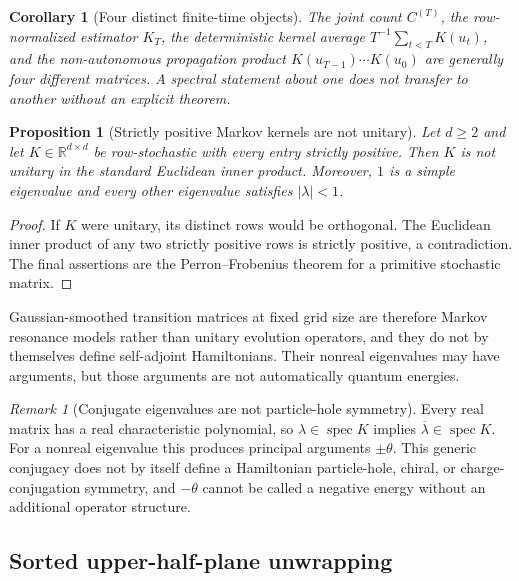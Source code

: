 \documentclass[11pt]{article}
\newtheorem{proposition}[theorem]{Proposition}
\newtheorem{corollary}[theorem]{Corollary}
\theoremstyle{definition}
\theoremstyle{remark}
\newtheorem{remark}[theorem]{Remark}
\newcommand{\R}{\mathbb R}
\newcommand{\spec}{\operatorname{spec}}
\begin{document}
\begin{corollary}[Four distinct finite-time objects]\label{cor:four-objects}
The joint count $C^{(T)}$, the row-normalized estimator $K_T$, the deterministic kernel average $T^{-1}\sum_{t<T}K(u_t)$, and the non-autonomous propagation product $K(u_{T-1})\cdots K(u_0)$ are generally four different matrices.  A spectral statement about one does not transfer to another without an explicit theorem.
\end{corollary}

\begin{proposition}[Strictly positive Markov kernels are not unitary]\label{prop:markov-not-unitary}
Let $d\ge2$ and let $K\in\R^{d\times d}$ be row-stochastic with every entry strictly positive.  Then $K$ is not unitary in the standard Euclidean inner product.
Moreover, $1$ is a simple eigenvalue and every other eigenvalue satisfies $|\lambda|<1$.
\end{proposition}

\begin{proof}
If $K$ were unitary, its distinct rows would be orthogonal.  The Euclidean inner product of any two strictly positive rows is strictly positive, a contradiction.  The final assertions are the Perron--Frobenius theorem for a primitive stochastic matrix.
\end{proof}

Gaussian-smoothed transition matrices at fixed grid size are therefore Markov resonance models rather than unitary evolution operators, and they do not by themselves define self-adjoint Hamiltonians.  Their nonreal eigenvalues may have arguments, but those arguments are not automatically quantum energies.

\begin{remark}[Conjugate eigenvalues are not particle-hole symmetry]\label{rem:conjugate}
Every real matrix has a real characteristic polynomial, so $\lambda\in\spec K$ implies $\overline\lambda\in\spec K$.  For a nonreal eigenvalue this produces principal arguments $\pm\theta$.  This generic conjugacy does not by itself define a Hamiltonian particle-hole, chiral, or charge-conjugation symmetry, and $-\theta$ cannot be called a negative energy without an additional operator structure.
\end{remark}

\subsection{Sorted upper-half-plane unwrapping}
\end{document}
